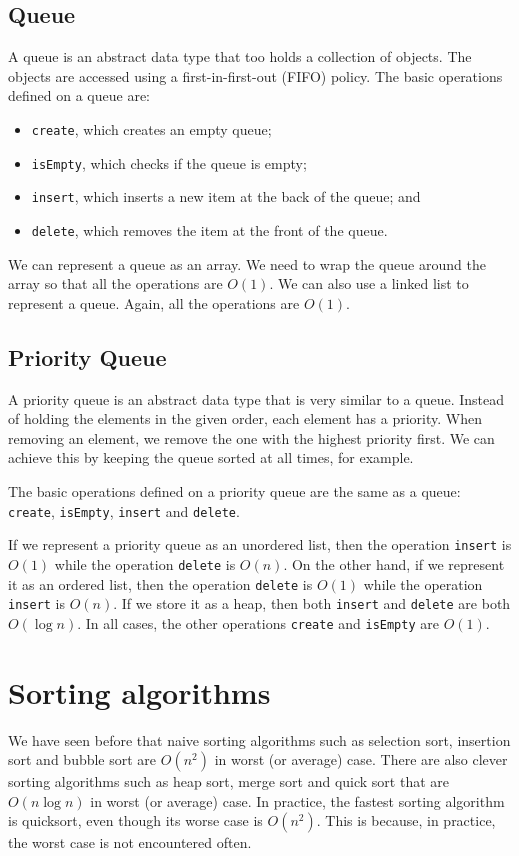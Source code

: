 \documentclass[a4paper, openany]{memoir}
\begin{document}
\subsection{Queue}
A queue is an abstract data type that too holds a collection of objects. The objects are accessed using a first-in-first-out (FIFO) policy. The basic operations defined on a queue are:
\begin{itemize}
    \item \texttt{create}, which creates an empty queue;
    \item \texttt{isEmpty}, which checks if the queue is empty;
    \item \texttt{insert}, which inserts a new item at the back of the queue; and
    \item \texttt{delete}, which removes the item at the front of the queue.
\end{itemize}
We can represent a queue as an array. We need to wrap the queue around the array so that all the operations are $O(1)$. We can also use a linked list to represent a queue. Again, all the operations are $O(1)$.

\subsection{Priority Queue}
A priority queue is an abstract data type that is very similar to a queue. Instead of holding the elements in the given order, each element has a priority. When removing an element, we remove the one with the highest priority first. We can achieve this by keeping the queue sorted at all times, for example.

The basic operations defined on a priority queue are the same as a queue: \texttt{create}, \texttt{isEmpty}, \texttt{insert} and \texttt{delete}.

If we represent a priority queue as an unordered list, then the operation \texttt{insert} is $O(1)$ while the operation \texttt{delete} is $O(n)$. On the other hand, if we represent it as an ordered list, then the operation \texttt{delete} is $O(1)$ while the operation \texttt{insert} is $O(n)$. If we store it as a heap, then both \texttt{insert} and \texttt{delete} are both $O(\log n)$. In all cases, the other operations \texttt{create} and \texttt{isEmpty} are $O(1)$.
\newpage

\section{Sorting algorithms}
We have seen before that naive sorting algorithms such as selection sort, insertion sort and bubble sort are $O(n^2)$ in worst (or average) case. There are also clever sorting algorithms such as heap sort, merge sort and quick sort that are $O(n \log n)$ in worst (or average) case. In practice, the fastest sorting algorithm is quicksort, even though its worse case is $O(n^2)$. This is because, in practice, the worst case is not encountered often.
\end{document}
